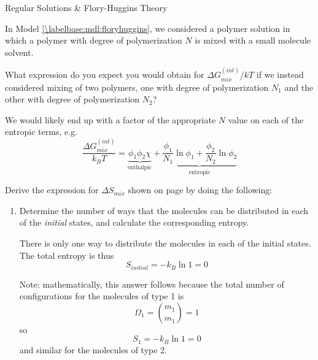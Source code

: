 \begin{activity}{Regular Solutions \& Flory-Huggins Theory}
\begin{exercises}
		\exercise In Model \ref{\labelbase:mdl:floryhuggins}, we considered a polymer solution in which a polymer with degree of polymerization $N$ is mixed with a small molecule solvent.
		
			What expression do you expect you would obtain for $\Delta G_{mix}^{(int)}/kT$ if we instead considered mixing of two polymers, one with degree of polymerization $N_1$ and the other with degree of polymerization $N_2$?
				
					\begin{solution}{}
						We would likely end up with a factor of the appropriate $N$ value on each of the entropic terms, e.g.
						\begin{equation*}
							\frac{\Delta G_{mix}^{(int)}}{k_B T} = \underbrace{\phi_1 \phi_2 \chi}_{\text{enthalpic}} + \underbrace{\frac{\phi_1}{N_1} \ln \phi_1 + \frac{\phi_2}{N_2} \ln \phi_2}_{\text{entropic}}
							\end{equation*}
						
					\end{solution}
					
		\exercise \label{\labelbase:exc:idealmixing} Derive the expression for $\Delta S_{mix}$ shown on page \pageref{\labelbase:eqn:idealS} by doing the following:
		
			\begin{enumerate}
				\item Determine the number of ways that the molecules can be distributed in each of the \emph{initial} states, and calculate the corresponding entropy.
				
					\begin{solution}{}
						There is only one way to distribute the molecules in each of the initial states.  The total entropy is thus
						\begin{equation*}
							S_{initial} = - k_B \ln 1 = 0
						\end{equation*}
						
						Note: mathematically, this answer follows because the total number of configurations for the molecules of type 1 is
						\begin{equation*}
							\Omega_1 = {m_1 \choose m_1} = 1
						\end{equation*}
						so
						\begin{equation*}
							S_1 = - k_B \ln 1 = 0
						\end{equation*}
						and similar for the molecules of type 2.
					
					\end{solution}
				

\end{enumerate}
\end{exercises}
\end{activity}
